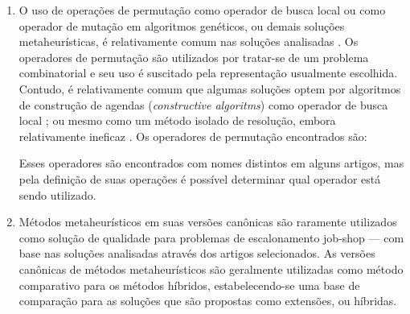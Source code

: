 \documentclass[relatorio,nocolorlinks]{inf-ufg}
\begin{document}
\begin{enumerate}
\item O uso de opera\c{c}\~{o}es de permuta\c{c}\~{a}o como operador de busca local ou como operador de muta\c{c}\~{a}o em algoritmos
gen\'{e}ticos, ou demais solu\c{c}\~{o}es metaheur\'{i}sticas, \'{e} relativamente comum nas solu\c{c}\~{o}es analisadas \cite{Lin2010}
\cite{Zhang2010} \cite{Xiaomei2010} \cite{Wang2010} \cite{Manikas2009} \cite{Zhang2009} \cite{Adibi2010} \cite{Roshanaei2009}. Os operadores de
permuta\c{c}\~{a}o s\~{a}o utilizados por tratar-se de um problema combinatorial e seu uso \'{e} suscitado pela representa\c{c}\~{a}o usualmente
escolhida. Contudo, \'{e} relativamente comum que algumas solu\c{c}\~{o}es optem por algoritmos de constru\c{c}\~{a}o de agendas
(\textit{constructive algoritms}) como operador de busca local \cite{Goncalves2002}; ou mesmo como um m\'{e}todo isolado de resolu\c{c}\~{a}o, embora
relativamente ineficaz \cite{French1982}. Os operadores de permuta\c{c}\~{a}o encontrados s\~{a}o:
Esses operadores s\~{a}o encontrados com nomes distintos em alguns artigos, mas pela defini\c{c}\~{a}o de suas opera\c{c}\~{o}es \'{e}
poss\'{i}vel determinar qual operador est\'{a} sendo utilizado.

\item M\'{e}todos metaheur\'{i}sticos em suas vers\~{o}es can\^{o}nicas s\~{a}o raramente utilizados como solu\c{c}\~{a}o de qualidade para problemas
de escalonamento job-shop --- com base nas solu\c{c}\~{o}es analisadas atrav\'{e}s dos artigos selecionados. As vers\~{o}es can\^{o}nicas de
m\'{e}todos metaheur\'{i}sticos s\~{a}o geralmente utilizadas como m\'{e}todo comparativo para os m\'{e}todos h\'{i}bridos, estabelecendo-se uma
base de compara\c{c}\~{a}o para as solu\c{c}\~{o}es que s\~{a}o propostas como extens\~{o}es, ou h\'{i}bridas.


\end{enumerate}
\end{document}

